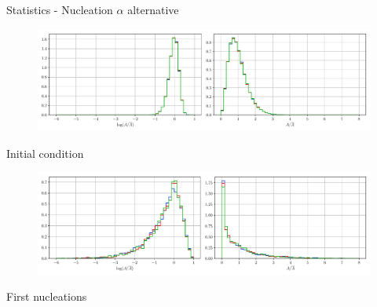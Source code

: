 \documentclass[usenames,dvipsnames]{beamer}
\begin{document}

\begin{frame}{Statistics - Nucleation $\alpha$ alternative}
\small
\centering
    \vspace{-0.5em}
    \begin{figure}
        \centering
        \includegraphics[scale=0.35]{figures/stored_energy/SE/areas/000000_nuclalternative_set.pdf}
    \end{figure}
    \vspace{-1em}
    Initial condition
    \begin{figure}
        \centering
        \includegraphics[scale=0.35]{figures/stored_energy/SE/areas/000070_nuclalternative_set.pdf}
    \end{figure}
    \vspace{-1em}
    First nucleations
\end{frame}
\end{document}
